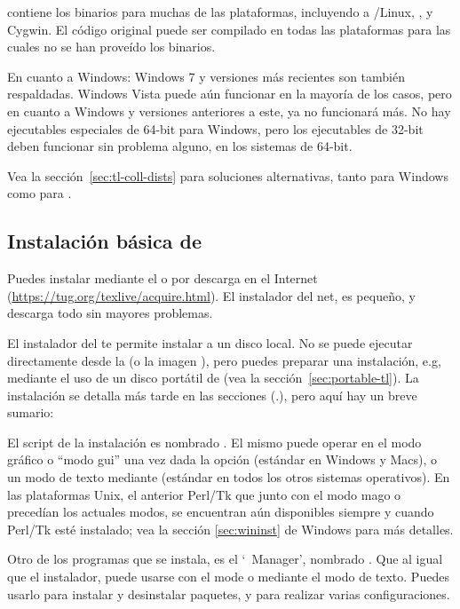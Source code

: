 \documentclass{article}
\begin{document}
\TL{} contiene los binarios para muchas de las plataformas, incluyendo
a \GNU/Linux, \MacOSX, y Cygwin. El código original puede ser
compilado en todas las plataformas para las cuales no se han proveído
los binarios.

En cuanto a Windows: Windows 7 y versiones más recientes
son también respaldadas. Windows Vista puede aún funcionar en la mayoría de los casos, pero en cuanto a Windows  y versiones anteriores a este, \TL{} ya no funcionará más. No hay
ejecutables especiales de 64-bit para Windows, pero los ejecutables de
32-bit deben funcionar sin problema alguno, en los sistemas de
64-bit.

Vea la sección~\ref{sec:tl-coll-dists} para soluciones alternativas,
tanto para Windows como para \MacOSX.

\subsection{Instalación básica de \protect\TL{}}
\label{sec:basic}

Puedes instalar \TL{} mediante el \DVD{} o por descarga en el Internet
(\url{https://tug.org/texlive/acquire.html}). El instalador del net, es
pequeño, y descarga todo sin mayores problemas. 

El instalador del \DVD{} te permite instalar a un disco local. No se
puede ejecutar directamente \TL{} desde la \TK{} \DVD{} (o la
imagen ), pero puedes preparar una instalación, e.g,
mediante el uso de un disco portátil de \USB{} (vea la
sección~\ref{sec:portable-tl}). La instalación se detalla más tarde en
las secciones (\p.\pageref{sec:install}), pero aquí hay un breve
sumario:

\begin{itemize*}

\item El script de la instalación es nombrado . El mismo
	puede operar en el modo gráfico o ``modo gui'' una vez dada la opción
		 (estándar en Windows y Macs), o un modo de texto
		mediante  (estándar en todos los otros sistemas
		operativos). En las plataformas Unix, el anterior Perl/Tk que
		junto con el modo mago o  precedían los actuales
		modos, se encuentran aún disponibles siempre y cuando Perl/Tk
		esté instalado; vea la  sección \ref{sec:wininst} de Windows
		para más detalles. 

\item Otro de los programas que se instala, es el `\TL\ Manager', nombrado
	. Que al igual que el instalador, puede usarse con el mode
		\GUI{} o mediante el modo de texto. Puedes usarlo para instalar
		y desinstalar paquetes, y para realizar varias configuraciones.

\end{itemize*}
\end{document}

